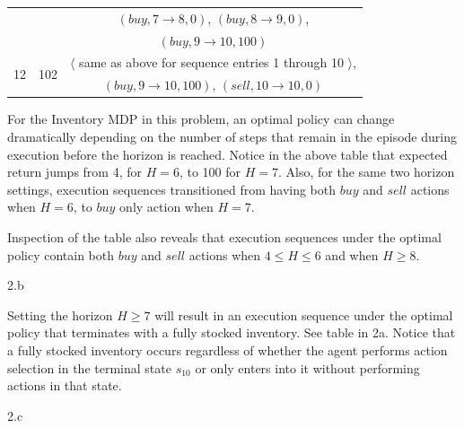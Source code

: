 \begin{answer}
\begin{table}[h!]
\begin{center}
\begin{tabular}{c|c|c}
							  & & $(buy, 7 \rightarrow 8, 0)$, $(buy, 8 \rightarrow 9, 0)$, \\
							  & & $(buy, 9 \rightarrow 10, 100)$ \\
	  \hline
  	  \multirow{2}{*}{12} & \multirow{2}{*}{102} & $\langle$ same as above for sequence entries 1 through 10 $\rangle$, \\
	  					      & & $(buy, 9 \rightarrow 10, 100)$, $(sell, 10 \rightarrow 10, 0)$ \\
    \end{tabular}
    \end{center}
  \end{table}

  For the Inventory MDP in this problem, an optimal policy can change dramatically depending on the number of steps 
  that remain in the episode during execution before the horizon is reached.  Notice in the above table that expected 
  return jumps from 4, for $H = 6$, to 100 for $H = 7$.  Also, for the same two horizon settings, execution sequences 
  transitioned from having both $buy$ and $sell$ actions when $H = 6$, to $buy$ only action when $H = 7$.

  Inspection of the table also reveals that execution sequences under the optimal policy contain both $buy$ and $sell$ 
  actions when $4 \le H \le 6$ and when $H \ge 8$.

\end{answer}
\clearpage

\LARGE
2.b
\normalsize

\begin{answer}
  Setting the horizon $H \ge 7$ will result in an execution sequence under the optimal policy
  that terminates with a fully stocked inventory. See table in 2a.  Notice that a fully stocked inventory
  occurs regardless of whether the agent performs action selection in the terminal state $s_{10}$ or
  only enters into it without performing actions in that state.
\end{answer}
\clearpage

\LARGE
2.c
\normalsize


